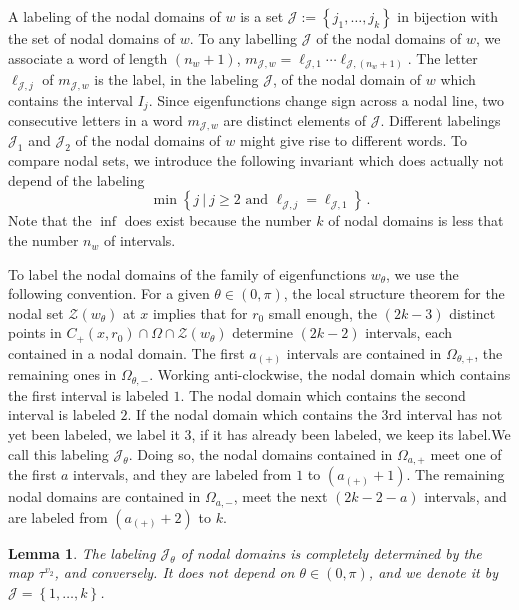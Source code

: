 \documentclass[12pt,a4paper]{amsart}
\theoremstyle{plain} %
\newtheorem{lemma}[theorem]{Lemma}
\theoremstyle{definition}
\numberwithin{equation}{section}
\numberwithin{figure}{section}
\numberwithin{table}{section}
\newcommand{\cJ}{\mathcal{J}}
\newcommand{\cZ}{\mathcal{Z}}
\newcommand{\set}[1]{\left\lbrace #1 \right\rbrace}
\begin{document}
{A labeling of the nodal domains of $w$ is a set $\cJ := \set{j_1, \ldots , j_k}$  in bijection with the set of nodal domains of $w$. To any labelling $\cJ$ of the nodal domains of $w$, we associate a word of length $(n_w+1)$, $m_{\cJ,w} =\ell_{\cJ,1} \cdots \ell_{\cJ,(n_w+1)}$. The letter $\ell_{\cJ,j}$ of $m_{\cJ,w}$ is the label, in the labeling $\cJ$, of the nodal domain of $w$ which contains the interval $I_j$. Since eigenfunctions change sign across a nodal line, two consecutive letters in a word $m_{\cJ,w}$ are distinct elements of $\cJ$. Different labelings $\cJ_1$ and $\cJ_2$ of the nodal domains of $w$ might give rise to different words. To compare nodal sets, we introduce the following invariant which does actually not depend of the labeling
%
\begin{equation}\label{E-invlab}
\min \set{j ~|~ j \ge 2 \text{~and~} \ell_{\cJ,j} = \ell_{\cJ,1}}\,.
\end{equation}
%
Note that the $\inf$ does exist because the number $k$ of nodal domains is less that the number $n_w$ of intervals.\smallskip


To label the nodal domains  of the family of eigenfunctions $w_{\theta}$, we use the following convention. For a given $\theta \in (0,\pi)$, the local structure theorem for the nodal set $\cZ(w_{\theta})$ at $x$ implies that for $r_0$ small enough, the  $(2k-3)$ distinct points in $ C_{+}(x,r_0) \cap \Omega \cap \cZ(w_{\theta})$ determine $(2k-2)$ intervals, each contained in a nodal domain.
The first $a_{(+)}$ intervals are contained in $\Omega_{\theta,+}$, the remaining ones in $\Omega_{\theta,-}$. Working anti-clockwise, the nodal domain which contains the first interval is labeled $1$. The nodal domain which contains the second interval is labeled $2$. If the nodal domain which contains the 3rd interval has not yet been labeled, we label it $3$, if it has already been labeled, we keep its label.We call this labeling $\cJ_{\theta}$. Doing so, the nodal domains contained in $\Omega_{a,+}$ meet one of the first $a$ intervals, and they are labeled from $1$ to $(a_{(+)}+1)$. The remaining nodal domains are contained in $\Omega_{a,-}$, meet the next $(2k-2-a)$ intervals, and are labeled from $(a_{(+)}+2)$ to $k$.

\begin{lemma}\label{L-hmn-210}
The labeling $\cJ_{\theta}$ of nodal domains is completely determined by the map $\tau^{v_2}$, and conversely. It does not depend on $\theta \in (0,\pi)$, and we denote it by $\cJ = \set{1,\ldots, k}$.
\end{lemma}%

}
\end{document}
